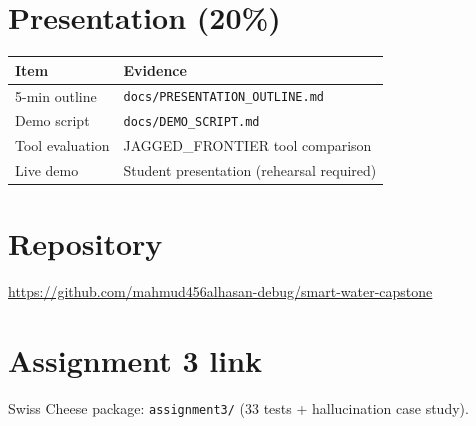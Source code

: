 \documentclass[11pt,a4paper]{article}
\begin{document}
\section{Presentation (20\%)}
\begin{tabular}{@{}p{4cm}p{9cm}@{}}
\toprule
Item & Evidence \\
\midrule
5-min outline & \texttt{docs/PRESENTATION\_OUTLINE.md} \\
Demo script & \texttt{docs/DEMO\_SCRIPT.md} \\
Tool evaluation & JAGGED\_FRONTIER tool comparison \\
Live demo & Student presentation (rehearsal required) \\
\bottomrule
\end{tabular}

\section{Repository}
\url{https://github.com/mahmud456alhasan-debug/smart-water-capstone}

\section{Assignment 3 link}
Swiss Cheese package: \texttt{assignment3/} (33 tests + hallucination case study).
\end{document}
